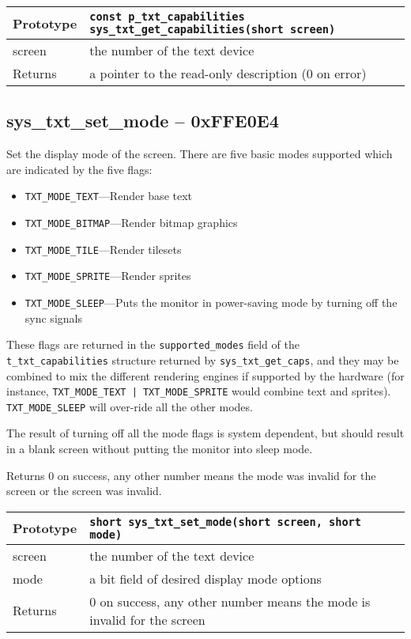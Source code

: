 \bigskip

\begin{tabular}{|l||l|} \hline
Prototype & \lstinline!const p_txt_capabilities sys_txt_get_capabilities(short screen)! \\ \hline
screen & the number of the text device \\ \hline
Returns & a pointer to the read-only description (0 on error) \\ \hline
\end{tabular}

\subsection*{sys\_txt\_set\_mode -- 0xFFE0E4}
Set the display mode of the screen. There are five basic modes supported which are indicated by the five flags:
\begin{itemize}
    \item \verb+TXT_MODE_TEXT+---Render base text
    \item \verb+TXT_MODE_BITMAP+---Render bitmap graphics
    \item \verb+TXT_MODE_TILE+---Render tilesets
    \item \verb+TXT_MODE_SPRITE+---Render sprites
    \item \verb+TXT_MODE_SLEEP+---Puts the monitor in power-saving mode by turning off the sync signals
\end{itemize}

These flags are returned in the \verb+supported_modes+ field of the \verb+t_txt_capabilities+ structure returned by \verb+sys_txt_get_caps+,
and they may be combined to mix the different rendering engines if supported by the hardware
(for instance, \verb+TXT_MODE_TEXT | TXT_MODE_SPRITE+ would combine text and sprites). \verb+TXT_MODE_SLEEP+ will over-ride all the other modes.

The result of turning off all the mode flags is system dependent, but should result in a blank screen without putting the monitor into sleep mode.

Returns 0 on success, any other number means the mode was invalid for the screen or the screen was invalid.

\bigskip

\begin{tabular}{|l||l|} \hline
Prototype & \lstinline!short sys_txt_set_mode(short screen, short mode)! \\ \hline
screen & the number of the text device \\ \hline
mode & a bit field of desired display mode options \\ \hline
Returns & 0 on success, any other number means the mode is invalid for the screen \\ \hline
\end{tabular}

